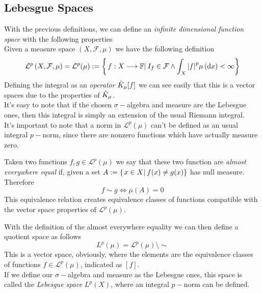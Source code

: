 \documentclass[../complete.tex]{subfiles}
\begin{document}
\subsection{Lebesgue Spaces}
\begin{dfn}
	With the previous definitions, we can define an \textit{infinite dimensional function space} with the following properties\\
	Given a measure space $(X,\mathcal{F},\mu)$ we have the following definition
	\begin{equation}
		\mathcal{L}^p\left( X,\mathcal{F},\mu \right)=\mathcal{L}^p(\mu):=\left\{\left.f: X\overset{}{\longrightarrow}\mathbb{F}\right|_{}I_f\in\mathcal{F}\wedge\int_{X}^{}\abs{f}^p\mu\left( \operatorname{d\!} x \right)<\infty \right\}
		\label{eq:mcLpspaces}
	\end{equation}
	Defining the integral as an \textit{operator} $\hat{K}_\mu[f]$ we can see easily that this is a vector spaces due to the properties of $\hat{K}_\mu$.\\
	It's easy to note that if the chosen $\sigma-$algebra and measure are the Lebesgue ones, then this integral is simply an extension of the usual Riemann integral.\\
	It's important to note that a norm in $\mathcal{L}^p(\mu)$ can't be defined as an usual integral $p-$norm, since there are nonzero functions which have actually measure zero.
\end{dfn}
\begin{dfn}
	Taken two functions $f,g\in\mathcal{L}^p(\mu)$ we say that these two function are \textit{almost everywhere equal} if, given a set $A:=\{\left.x\in X\right|_{}f(x)\ne g(x)\}$ has null measure. Therefore
	\begin{equation}
		f\sim g\iff{}\mu(A)=0
		\label{eq:almosteverywhereeq}
	\end{equation}
	This equivalence relation creates equivalence classes of functions compatible with the vector space properties of $\mathcal{L}^p(\mu)$.
\end{dfn}
\begin{dfn}[$L^p$-Spaces]
	With the definition of the almost everywhere equality we can then define a quotient space as follows
	\begin{equation}
		L^p(\mu)=\mathcal{L}^p(\mu)\setminus\sim
		\label{eq:lspace}
	\end{equation}
	This is a vector space, obviously, where the elements are the equivalence classes of functions $f\in\mathcal{L}^p(\mu)$, indicated as $[f]$.\\
	If we define our $\sigma-$algebra and measure as the Lebesgue ones, this space is called the \textit{Lebesgue space} $L^p(X)$, where an integral $p-$norm can be defined.
\end{dfn}
\end{document}
